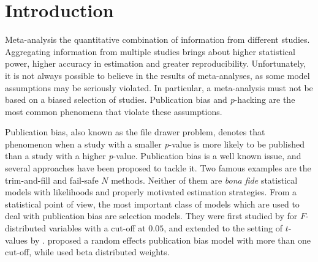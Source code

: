 \documentclass{article}
\theoremstyle{plain}
\theoremstyle{definition}
\begin{document}



\section{Introduction}

Meta-analysis the quantitative combination of information from different studies. Aggregating information from multiple studies brings about higher statistical power, higher accuracy in estimation and greater reproducibility. Unfortunately, it is not always possible to believe in the results of meta-analyses, as some model assumptions may be seriously violated. In particular, a meta-analysis must not be based on a biased selection of studies. Publication bias \citep{sterling1959publication} and \textit{p}-hacking \citep{simmons2011false} are the most common phenomena that violate these assumptions. 

Publication bias, also known as the file drawer problem, \citep[see, e.g.,][]{iyengar1988selection} denotes that phenomenon when a study with a smaller \textit{p}-value is more likely to be published than a study with a higher \textit{p}-value. Publication bias is a well known issue, and several approaches have been proposed to tackle it. Two famous examples are the trim-and-fill \citep{duval2000trim} and fail-safe $N$ \citep{becker2005failsafe} methods. Neither of them are \textit{bona fide} statistical models with likelihoods and properly motivated estimation strategies. From a statistical point of view, the most important class of models which are used to deal with publication bias are selection models. They were first studied by \citet{hedges1984estimation} for $F$-distributed variables with a cut-off at $0.05$, and extended to the setting of $t$-values by \citet{iyengar1988selection}. \citet{hedges1992modeling} proposed a random effects publication bias model with more than one cut-off, while \citet{citkowicz2017parsimonious} used beta distributed weights.
\end{document}

